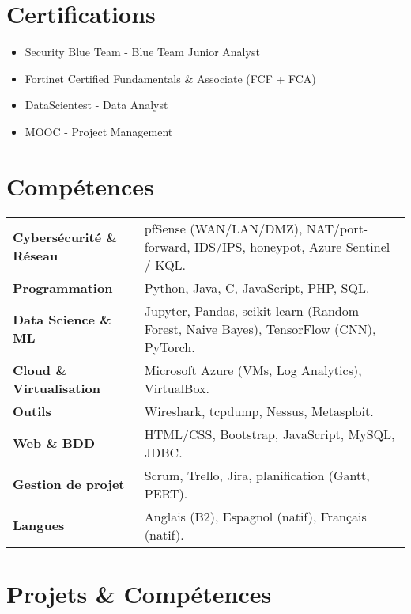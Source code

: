 \documentclass[a4paper,10pt]{article}
\begin{document}
\section*{Certifications}

\begin{itemize}[leftmargin=*]
    \item Security Blue Team - Blue Team Junior Analyst
    \item Fortinet Certified Fundamentals \& Associate (FCF + FCA) 
    \item DataScientest - Data Analyst
    \item MOOC - Project Management
\end{itemize}

\section*{Compétences}

\begin{tabular}{p{5cm} p{15cm}}
\textbf{Cybersécurité \& Réseau} & pfSense (WAN/LAN/DMZ), NAT/port-forward, IDS/IPS, honeypot, Azure Sentinel / KQL. \\
\textbf{Programmation} & Python, Java, C, JavaScript, PHP, SQL. \\
\textbf{Data Science \& ML} & Jupyter, Pandas, scikit-learn (Random Forest, Naive Bayes), TensorFlow (CNN), PyTorch. \\
\textbf{Cloud \& Virtualisation} & Microsoft Azure (VMs, Log Analytics), VirtualBox. \\
\textbf{Outils} & Wireshark, tcpdump, Nessus, Metasploit. \\
\textbf{Web \& BDD} & HTML/CSS, Bootstrap, JavaScript, MySQL, JDBC. \\
\textbf{Gestion de projet} & Scrum, Trello, Jira, planification (Gantt, PERT). \\
\textbf{Langues} & Anglais (B2), Espagnol (natif), Français (natif). \\
\end{tabular}




\section*{Projets \& Compétences}
\end{document}
